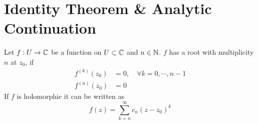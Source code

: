 \documentclass[../../script.tex]{subfiles}
\begin{document}
\section{Identity Theorem \& Analytic Continuation}

\begin{defi}
    Let $f: U \rightarrow \mathbb{C}$ be a function on $U \subset \mathbb{C}$ and $n \in \mathbb{N}$. $f$ has a root with multiplicity $n$ at $z_0$, if 
    \begin{align*}
        f^{(k)} (z_0) &= 0, \quad \forall k = 0, \cdots, n - 1 \\
        f^{(n)} (z_0) &= 0
    \end{align*}
    If $f$ is holomorphic it can be written as 
    \[
        f(z) = \sum_{k=n}^{\infty} c_n (z - z_0)^k
    \]
\end{defi}
\end{document}
